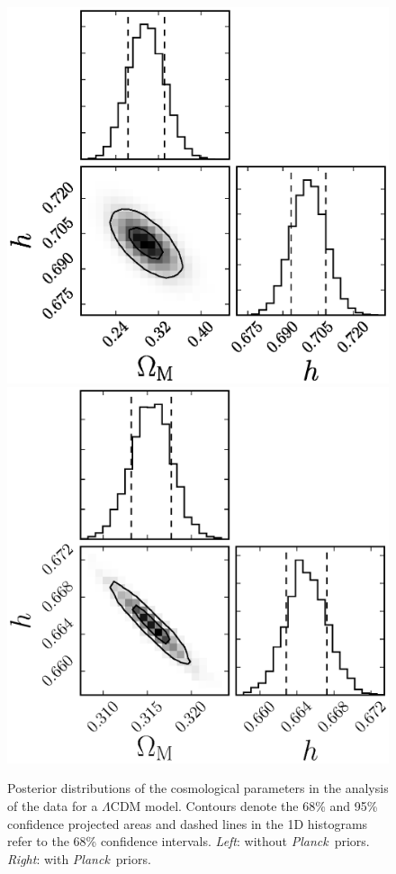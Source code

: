 \documentclass[12pt,a4paper]{article}
\newcommand\Planck{{\it Planck}\ }
\begin{document}
\begin{figure}
  \includegraphics[width=0.5\linewidth]{figures/betoule_lcdm_noprior_corner.eps}
  \includegraphics[width=0.5\linewidth]{figures/betoule_lcdm_withprior_corner.eps}
  \caption{Posterior distributions of the cosmological parameters in the
    analysis of the \citet{betoule2014} data for a $\Lambda$CDM model. Contours denote the
    68\% and 95\% confidence projected areas and dashed lines in
    the 1D histograms refer to the 68\% confidence intervals. {\it Left}: without 
    \Planck priors. {\it Right}: with \Planck priors.}
  \label{fig:betoule_lcdm_corner}
\end{figure}
%
\end{document}
